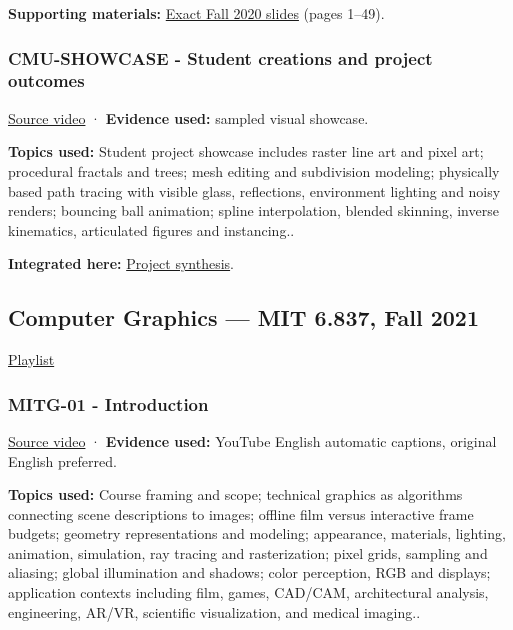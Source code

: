 \textbf{Supporting materials:} \href{https://15462.courses.cs.cmu.edu/fall2020content/lectures/23_pdes/23_pdes_slides.pdf}{Exact Fall 2020 slides} (pages 1--49).

\subsubsection{CMU-SHOWCASE - Student creations and project outcomes}\label{04-visual-computing-ii-ch036-cmu-showcase---student-creations-and-project-outcomes}

\href{https://www.youtube.com/watch?v=yJ5eY3EIImA}{Source video} · \textbf{Evidence used:} sampled visual showcase.

\textbf{Topics used:} Student project showcase includes raster line art and pixel art; procedural fractals and trees; mesh editing and subdivision modeling; physically based path tracing with visible glass, reflections, environment lighting and noisy renders; bouncing ball animation; spline interpolation, blended skinning, inverse kinematics, articulated figures and instancing..

\textbf{Integrated here:} \hyperref[04-visual-computing-ii-ch034-photographic-workflow-and-integrated-decisions]{Project synthesis}.

\subsection{Computer Graphics --- MIT 6.837, Fall 2021}\label{04-visual-computing-ii-ch036-computer-graphics-mit-6.837-fall-2021}

\href{https://www.youtube.com/playlist?list=PLQ3UicqQtfNtqt2yL3KgKV-yn0NEPbRVi}{Playlist}

\subsubsection{MITG-01 - Introduction}\label{04-visual-computing-ii-ch036-mitg-01---introduction}

\href{https://www.youtube.com/watch?v=tPzC879i-ag}{Source video} · \textbf{Evidence used:} YouTube English automatic captions, original English preferred.

\textbf{Topics used:} Course framing and scope; technical graphics as algorithms connecting scene descriptions to images; offline film versus interactive frame budgets; geometry representations and modeling; appearance, materials, lighting, animation, simulation, ray tracing and rasterization; pixel grids, sampling and aliasing; global illumination and shadows; color perception, RGB and displays; application contexts including film, games, CAD/CAM, architectural analysis, engineering, AR/VR, scientific visualization, and medical imaging..

